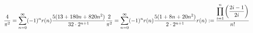 \documentclass[preview]{standalone}
\begin{document}
\begin{align*}
\frac{4}{\pi^2} = \sum_{n=0}^{\infty} (-1)^n r(n) \frac{5(13 + 180n + 820n^2)}{32 \cdot 2^{n+1}}
\frac{2}{\pi^2} = \sum_{n=0}^{\infty} (-1)^n r(n) \frac{5(1 + 8n + 20n^2)}{2 \cdot 2^{n+1}}
 r(n) := \frac{\displaystyle\prod_{i=1}^{n} \left(\frac{2i-1}{2i}\right)}{n!} \newline
\end{align*}
\end{document}
